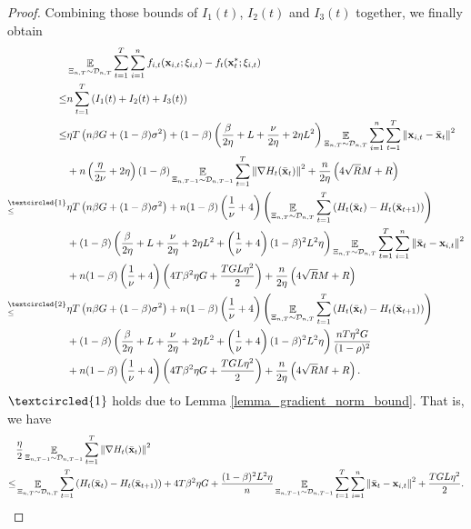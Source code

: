 \documentclass{article}
\begin{document}
\begin{proof}
Combining those bounds of $I_1(t)$, $I_2(t)$ and $I_3(t)$ together, we finally obtain
\begin{align}
\nonumber
& \EE_{ \Xi_{n,T} \sim \Dcal_{n,T} } \sum_{t=1}^T\sum_{i=1}^n f_{i,t}(\x_{i,t};\xi_{i,t}) - f_t(\x_t^\ast;\xi_{i,t}) \\ \nonumber
\le & n \sum_{t=1}^T \lrincir{ I_1(t) + I_2(t) + I_3(t) } \\ \nonumber
\le & \eta T \lrincir{ n\beta G + (1-\beta)\sigma^2} + (1-\beta)\lrincir{\frac{\beta}{2\eta } +L + \frac{\nu}{2\eta} + 2\eta L^2 } \EE_{ \Xi_{n,T} \sim \Dcal_{n,T} }\sum_{i=1}^n \sum_{t=1}^T \lrnorm{\x_{i,t} - \bar{\x}_t}^2  \\ \nonumber
& + n\lrincir{ \frac{\eta}{2\nu} + 2\eta }(1-\beta)\EE_{ \Xi_{n,T-1} \sim \Dcal_{n,T-1} }\sum_{t=1}^T\lrnorm{\nabla H_t(\bar{\x}_t)}^2  + \frac{n}{2\eta}\lrincir{ 4\sqrt{R}M + R  } \\ \nonumber
\refabovecir{\le}{\textcircled{1}} & \eta T \lrincir{ n\beta G + (1-\beta)\sigma^2} + n(1-\beta)\lrincir{ \frac{1}{\nu} + 4 } \lrincir{ \EE_{ \Xi_{n,T} \sim \Dcal_{n,T} } \sum_{t=1}^T  \lrincir{H_t(\bar{\x}_t) - H_t(\bar{\x}_{t+1})}  } \\ \nonumber
& + (1-\beta)\lrincir{\frac{\beta}{2\eta } +L + \frac{\nu}{2\eta} + 2\eta L^2  + \lrincir{\frac{1}{\nu} + 4}(1-\beta)^2L^2 \eta}  \EE_{ \Xi_{n,T} \sim \Dcal_{n,T} }\sum_{t=1}^T\sum_{i=1}^n \lrnorm{ \bar{\x}_t - \x_{i,t} }^2  \\ \nonumber
& + n(1-\beta)\lrincir{ \frac{1}{\nu} + 4 } \lrincir{ 4T\beta^2 \eta G + \frac{TGL\eta^2}{2} }  + \frac{n}{2\eta}\lrincir{ 4\sqrt{R}M + R  }\\ \nonumber
\refabovecir{\le}{\textcircled{2}} & \eta T \lrincir{ n\beta G + (1-\beta)\sigma^2} + n(1-\beta)\lrincir{ \frac{1}{\nu} + 4 } \lrincir{ \EE_{ \Xi_{n,T} \sim \Dcal_{n,T} } \sum_{t=1}^T  \lrincir{H_t(\bar{\x}_t) - H_t(\bar{\x}_{t+1})}  } \\ \nonumber
& + (1-\beta)\lrincir{\frac{\beta}{2\eta } +L + \frac{\nu}{2\eta} + 2\eta L^2  + \lrincir{\frac{1}{\nu} + 4}(1-\beta)^2L^2 \eta}  \frac{nT\eta^2 G }{(1-\rho)^2}  \\ \nonumber
& + n(1-\beta)\lrincir{ \frac{1}{\nu} + 4 } \lrincir{ 4T\beta^2 \eta G + \frac{TGL\eta^2}{2} }  + \frac{n}{2\eta}\lrincir{ 4\sqrt{R}M + R  }.
\end{align}  
$\textcircled{1}$ holds due to Lemma \ref{lemma_gradient_norm_bound}. That is, we have
\begin{align}
& \frac{\eta}{2} \mathop{\mathbb{E}}_{ \Xi_{n,T-1} \sim \mathcal{D}_{n,T-1} }\sum_{t=1}^T \left\lVert\nabla H_t(\bar{{\bf x}}_t)\right\rVert^2 \\ \nonumber
\le & \mathop{\mathbb{E}}_{ \Xi_{n,T} \sim \mathcal{D}_{n,T} } \sum_{t=1}^T  \left( H_t(\bar{{\bf x}}_t) - H_t(\bar{{\bf x}}_{t+1}) \right) + 4T\beta^2 \eta G + \frac{(1-\beta)^2L^2 \eta}{n}\mathop{\mathbb{E}}_{ \Xi_{n,T-1} \sim \mathcal{D}_{n,T-1} }\sum_{t=1}^T\sum_{i=1}^n \left\lVert \bar{{\bf x}}_t - {\bf x}_{i,t} \right\rVert^2 + \frac{TGL\eta^2}{2}.
\end{align} 


\end{proof}
\end{document}
